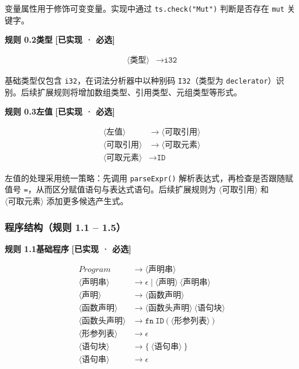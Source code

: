 \documentclass[12pt,a4paper]{ctexart}
\begin{document}
变量属性用于修饰可变变量。实现中通过 \texttt{ts.check("Mut")} 判断是否存在 \texttt{mut} 关键字。

\textbf{规则 0.2\quad 类型} \hfill \textcolor{green!60!black}{\textbf{[已实现 · 必选]}}

\begin{align}
\langle\text{类型}\rangle &\rightarrow \texttt{i32}
\end{align}

基础类型仅包含 \texttt{i32}，在词法分析器中以种别码 \texttt{I32}（类型为 \texttt{declerator}）识别。后续扩展规则将增加数组类型、引用类型、元组类型等形式。

\textbf{规则 0.3\quad 左值} \hfill \textcolor{green!60!black}{\textbf{[已实现 · 必选]}}

\begin{align}
\langle\text{左值}\rangle &\rightarrow \langle\text{可取引用}\rangle \\
\langle\text{可取引用}\rangle &\rightarrow \langle\text{可取元素}\rangle \\
\langle\text{可取元素}\rangle &\rightarrow \texttt{ID}
\end{align}

左值的处理采用统一策略：先调用 \texttt{parseExpr()} 解析表达式，再检查是否跟随赋值号 \texttt{=}，从而区分赋值语句与表达式语句。后续扩展规则为 $\langle\text{可取引用}\rangle$ 和 $\langle\text{可取元素}\rangle$ 添加更多候选产生式。

\subsubsection{程序结构（规则 1.1 -- 1.5）}

\textbf{规则 1.1\quad 基础程序} \hfill \textcolor{green!60!black}{\textbf{[已实现 · 必选]}}

\begin{align}
Program &\rightarrow \langle\text{声明串}\rangle \\
\langle\text{声明串}\rangle &\rightarrow \epsilon \mid \langle\text{声明}\rangle \ \langle\text{声明串}\rangle \\
\langle\text{声明}\rangle &\rightarrow \langle\text{函数声明}\rangle \\
\langle\text{函数声明}\rangle &\rightarrow \langle\text{函数头声明}\rangle \ \langle\text{语句块}\rangle \\
\langle\text{函数头声明}\rangle &\rightarrow \texttt{fn} \ \texttt{ID} \ \texttt{(} \ \langle\text{形参列表}\rangle \ \texttt{)} \\
\langle\text{形参列表}\rangle &\rightarrow \epsilon \\
\langle\text{语句块}\rangle &\rightarrow \texttt{\{} \ \langle\text{语句串}\rangle \ \texttt{\}} \\
\langle\text{语句串}\rangle &\rightarrow \epsilon
\end{align}
\end{document}
